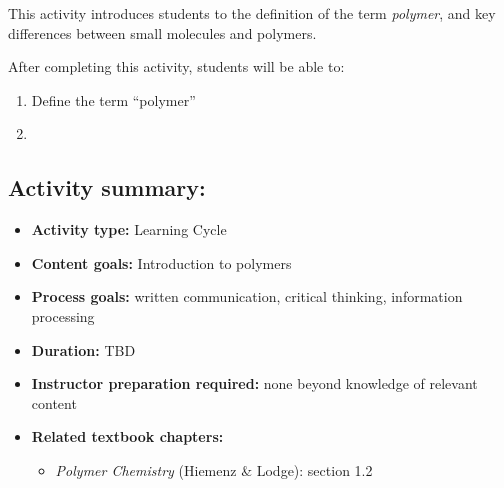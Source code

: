 %
%
%
%

\renewcommand{\figpath}{content/intro/molecules-to-polymers/figs}
\renewcommand{\labelbase}{molecules-to-polymers}

\begin{activity}

\begin{instructornotes}

	This activity introduces students to the definition of the term \emph{polymer}, and key differences between small molecules and polymers.
	
	After completing this activity, students will be able to:
			\begin{enumerate}
				\item Define the term ``polymer''
				\item 
			\end{enumerate}
			
	\subsection*{Activity summary:}
	\begin{itemize}
		\item \textbf{Activity type:} Learning Cycle
		\item \textbf{Content goals:} Introduction to polymers
		\item \textbf{Process goals:} %
			written communication, critical thinking, information processing
		\item \textbf{Duration:} TBD
		\item \textbf{Instructor preparation required:} none beyond knowledge of relevant content
		\item \textbf{Related textbook chapters:}
			\begin{itemize}
				\item \emph{Polymer Chemistry} (Hiemenz \& Lodge): section 1.2
			\end{itemize}
	\end{itemize}


\end{instructornotes}
\end{activity}
